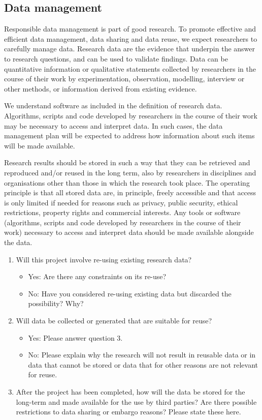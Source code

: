 \documentclass{article}
\begin{document}
\subsection{Data management}
Responsible data management is part of good research. To promote effective and efficient data management, data sharing and data reuse, we expect researchers to carefully manage data. Research data are the evidence that underpin the answer to research questions, and can be used to validate findings. Data can be quantitative information or qualitative statements collected by researchers in the course of their work by experimentation, observation, modelling, interview or other methods, or information derived from existing evidence.

We understand software as included in the definition of research data. Algorithms, scripts and code developed by researchers in the course of their work may be necessary to access and interpret data. In such cases, the data management plan will be expected to address how information about such items will be made available.

Research results should be stored in such a way that they can be retrieved and reproduced and/or reused in the long term, also by researchers in disciplines and organisations other than those in which the research took place. The operating principle is that all stored data are, in principle, freely accessible and that access is only limited if needed for reasons such as privacy, public security, ethical restrictions, property rights and commercial interests. Any tools or software (algorithms, scripts and code developed by researchers in the course of their work) necessary to access and interpret data should be made available alongside the data.

\begin{enumerate}
  \item Will this project involve re-using existing research data?
        \begin{itemize}
          \item Yes: Are there any constraints on its re-use?
          \item No: Have you considered re-using existing data but discarded the possibility? Why?
        \end{itemize}

  \item Will data be collected or generated that are suitable for reuse?
        \begin{itemize}
          \item Yes: Please answer question 3.
          \item No: Please explain why the research will not result in reusable data or in data that cannot be stored or data that for other reasons are not relevant for reuse.
        \end{itemize}

  \item After the project has been completed, how will the data be stored for the long-term and made available for the use by third parties? Are there possible restrictions to data sharing or embargo reasons? Please state these here.
\end{enumerate}
\end{document}
